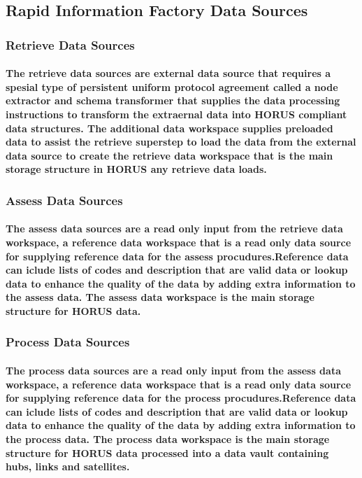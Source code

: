\documentclass{acm_proc_article-sp}
\begin{document}
\subsection{Rapid Information Factory Data Sources}
\subsubsection{Retrieve Data Sources}
\paragraph{The retrieve data sources are external data source that requires a spesial type of persistent uniform protocol agreement called a node extractor and schema transformer that supplies the data processing instructions to transform the extraernal data into HORUS compliant data structures. The additional data workspace supplies preloaded data to assist the retrieve superstep to load the data from the external data source to create the retrieve data workspace that is the main storage structure in HORUS any retrieve data loads.}
\subsubsection{Assess Data Sources}
\paragraph{The assess data sources are a read only input from the retrieve data workspace, a reference data workspace that is a read only data source for supplying reference data for the assess procudures.Reference data can iclude lists of codes and description that are valid data or lookup data to enhance the quality of the data by adding extra information to the assess data. The assess data workspace is the main storage structure for HORUS data.}
\subsubsection{Process Data Sources}
\paragraph{The process data sources are a read only input from the assess data workspace, a reference data workspace that is a read only data source for supplying reference data for the process procudures.Reference data can iclude lists of codes and description that are valid data or lookup data to enhance the quality of the data by adding extra information to the process data. The process data workspace is the main storage structure for HORUS data processed into a data vault containing hubs, links and satellites. }
\end{document}
